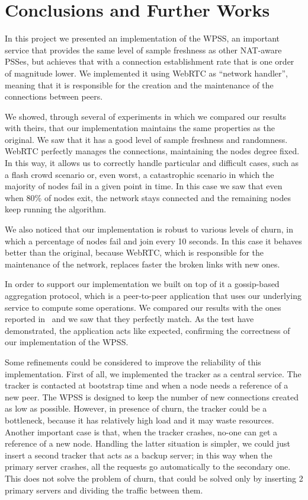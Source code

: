 
\chapter{Conclusions and Further Works}
\label{cha:conclusions}
In this project we presented an implementation of the WPSS, an important service that provides the same level of sample freshness as other NAT-aware PSSes, but achieves that with a connection establishment rate that is one order of magnitude lower. We implemented it using WebRTC as ``network handler'', meaning that it is responsible for the creation and the maintenance of the connections between peers.

We showed, through several of experiments in which we compared our results with theirs, that our implementation maintains the same properties as the original. We saw that it has a good level of sample freshness and randomness. WebRTC perfectly manages the connections, maintaining the nodes degree fixed. In this way, it allows us to correctly handle particular and difficult cases, such as a flash crowd scenario or, even worst, a catastrophic scenario in which the majority of nodes fail in a given point in time. In this case we saw that even when 80\% of nodes exit, the network stays connected and the remaining nodes keep running the algorithm. 

We also noticed that our implementation is robust to various levels of churn, in which a percentage of nodes fail and join every 10 seconds. In this case it behaves better than the original, because WebRTC, which is responsible for the maintenance of the network, replaces faster the broken links with new ones. 

In order to support our implementation we built on top of it a gossip-based aggregation protocol, which is a peer-to-peer application that uses our underlying service to compute some operations. We compared our results with the ones reported in~\cite{aggregation} and we saw that they perfectly match. As the test have demonstrated, the application acts like expected, confirming the correctness of our implementation of the WPSS. 

Some refinements could be considered to improve the reliability of this implementation. First of all, we implemented the tracker as a central service. The tracker is contacted at bootstrap time and when a node needs a reference of a new peer. The WPSS is designed to keep the number of new connections created as low as possible. However, in presence of churn, the tracker could be a bottleneck, because it has relatively high load and it may waste resources. Another important case is that, when the tracker crashes, no-one can get a reference of a new node. Handling the latter situation is simpler, we could just insert a second tracker that acts as a backup server; in this way when the primary server crashes, all the requests go automatically to the secondary one. This does not solve the problem of churn, that could be solved only by inserting 2 primary servers and dividing the traffic between them. 

